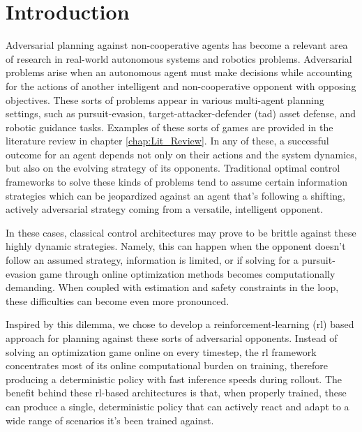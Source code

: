 \chapter{Introduction}


Adversarial planning against non-cooperative agents has become a relevant area of research in real-world autonomous systems and robotics problems. Adversarial problems arise when an autonomous agent must make decisions while accounting for the actions of another intelligent and non-cooperative opponent with opposing objectives. These sorts of problems appear in various multi-agent planning settings, such as pursuit-evasion, target-attacker-defender (\acs{tad}) asset defense, and robotic guidance tasks. Examples of these sorts of games are provided in the literature review in chapter \ref{chap:Lit_Review}. In any of these, a successful outcome for an agent depends not only on their actions and the system dynamics, but also on the evolving strategy of its opponents. Traditional optimal control frameworks to solve these kinds of problems tend to assume certain information strategies which can be jeopardized against an agent that's following a shifting, actively adversarial strategy coming from a versatile, intelligent opponent. 

In these cases, classical control architectures may prove to be brittle against these highly dynamic strategies. Namely, this can happen when the opponent doesn't follow an assumed strategy, information is limited, or if solving for a pursuit-evasion game through online optimization methods becomes computationally demanding. When coupled with estimation and safety constraints in the loop, these  difficulties can become even more pronounced.

Inspired by this dilemma, we chose to develop a reinforcement-learning (\acs{rl}) based approach for planning against these sorts of adversarial opponents. Instead of solving an optimization game online on every timestep, the \acs{rl} framework concentrates most of its online computational burden on training, therefore producing a deterministic policy with fast inference speeds during rollout. The benefit behind these \acs{rl}-based architectures is that, when properly trained, these can produce a single, deterministic policy that can actively react and adapt to a wide range of scenarios it's been trained against.

